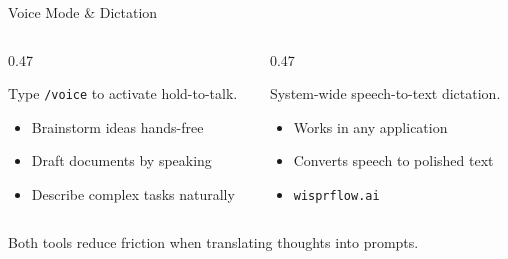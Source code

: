\documentclass[aspectratio=169, 10pt]{beamer}
\begin{document}
\begin{frame}{Voice Mode \& Dictation}
\begin{columns}[T]
\begin{column}{0.47\textwidth}
\begin{tcolorbox}[keybox, title={\faMicrophone\quad Voice in Claude Code}]
\scriptsize
Type \texttt{/voice} to activate hold-to-talk.
\vskip3pt
\begin{itemize}\setlength{\itemsep}{1pt}
  \item Brainstorm ideas hands-free
  \item Draft documents by speaking
  \item Describe complex tasks naturally
\end{itemize}
\end{tcolorbox}
\end{column}
\begin{column}{0.47\textwidth}
\begin{tcolorbox}[keybox, title={\faKeyboard\quad Wispr Flow}]
\scriptsize
System-wide speech-to-text dictation.
\vskip3pt
\begin{itemize}\setlength{\itemsep}{1pt}
  \item Works in any application
  \item Converts speech to polished text
  \item \texttt{wisprflow.ai}
\end{itemize}
\end{tcolorbox}
\end{column}
\end{columns}
\vskip6pt
{\scriptsize\color{CoolGray} Both tools reduce friction when translating thoughts into prompts.}
\end{frame}
\end{document}
